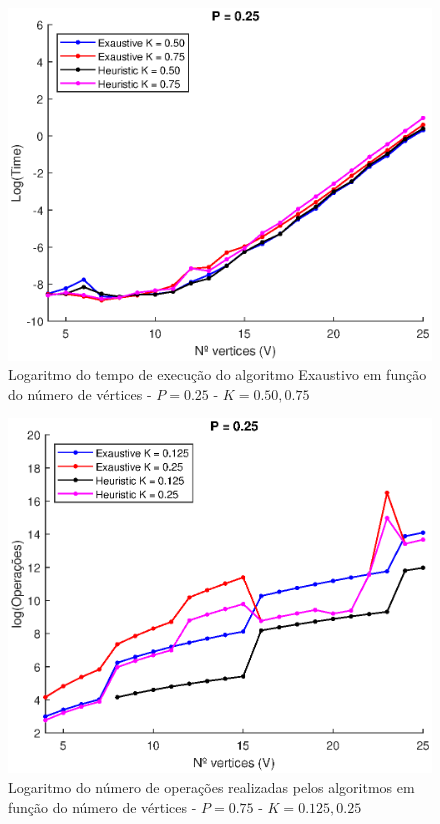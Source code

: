 \documentclass{revdetua}
\begin{document}
\begin{figure}[h!]
\centering
\includegraphics[scale = 0.5]{Figs/2_P025.eps}
\caption{Logaritmo do tempo de execução do algoritmo Exaustivo em função do número de vértices - $P = 0.25$ - $K = 0.50, 0.75$}
\label{2_P025}
\end{figure}

\begin{figure}[h!]
\centering
\includegraphics[scale = 0.5]{Figs/3_P025.eps}
\caption{Logaritmo do número de operações realizadas pelos algoritmos em função do número de vértices - $P = 0.75$ - $K = 0.125, 0.25$}
\label{3_P025}
\end{figure}
\end{document}
